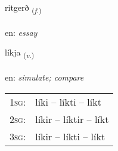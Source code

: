 \documentclass[frontgrid, backgrid]{flacards}\usepackage[]{graphicx}\usepackage[]{color}
\begin{document}
\renewcommand{\flhead}{\vskip5pt \fboxsep=0pt {\small\bfseries\footnotesize Nafnorð | Noun}}
\renewcommand{\fcfoot}{\vskip5pt \fboxsep=0pt \hspace{2pt}{\small\bfseries\footnotesize 2K}}

\renewcommand{\blhead}{\vskip5pt {\small\bfseries\footnotesize Nafnorð | Noun }}
\renewcommand{\bcfoot}{\vskip5pt \hspace{2pt}{\small\bfseries\footnotesize 2K}}


{ritgerð \small{\textsubscript{(\textit{f.})}} \\[1ex] %
\textphonetic{[rɪːtcɛrð]} \\
en: \emph{essay} \\  [2ex]
\renewcommand*{\arraystretch}{0.8}
}

\renewcommand{\flhead}{\vskip5pt \fboxsep=0pt {\small\bfseries\footnotesize Sagnorð | Verb}}
\renewcommand{\fcfoot}{\vskip5pt \fboxsep=0pt \hspace{2pt}{\small\bfseries\footnotesize 2K}}

\renewcommand{\blhead}{\vskip5pt {\small\bfseries\footnotesize Sagnorð | Verb }}
\renewcommand{\bcfoot}{\vskip5pt \hspace{2pt}{\small\bfseries\footnotesize 2K}}


{líkja \small{\textsubscript{(\textit{v.})}} \\[1ex] %
\textphonetic{[liːca]} \\
en: \emph{simulate; compare} \\  [2ex]
\renewcommand*{\arraystretch}{0.8}
\begin{tabular}{p{1cm}l}
\textsc{1sg}: & líki -- líkti -- líkt \\ 
\textsc{2sg}: & líkir -- líktir -- líkt \\ 
\textsc{3sg}: & líkir -- líkti -- líkt \\ 
\end{tabular}
}
\end{document}
